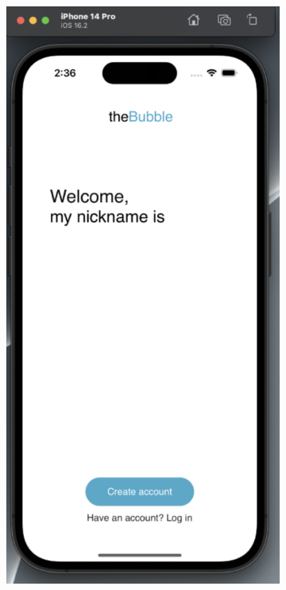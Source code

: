 \documentclass[a4paper, 11pt]{report}
\begin{document}
\begin{figure}
  \begin{subfigure}[h]{0.5\textwidth}
    \includegraphics[width=\textwidth]{1.png}

\end{subfigure}
\end{figure}
\end{document}
